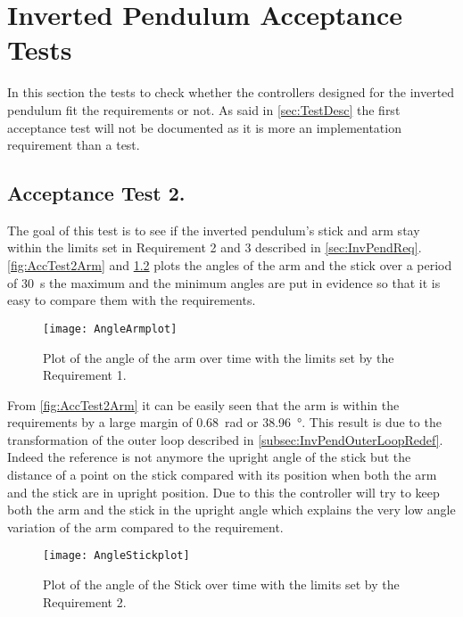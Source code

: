 \graphicspath{{figures/AcceptanceTest/}}

\chapter{Inverted Pendulum Acceptance Tests}\label{sec:InvPendAccTest}

In this section the tests to check whether the controllers designed for the inverted pendulum fit the requirements or not. As said in \autoref{sec:TestDesc} the first acceptance test will not be documented as it is more an implementation requirement than a test.

\section{Acceptance Test 2.}

The goal of this test is to see if the inverted pendulum's stick and arm stay within the limits set in Requirement 2 and 3 described in \autoref{sec:InvPendReq}. \autoref{fig:AccTest2Arm} and \ref{fig:AccTest2Stick} plots the angles of the arm and the stick over a period of \SI{30}{\second} the maximum and the minimum angles are put in evidence so that it is easy to compare them with the requirements.

\begin{figure} [htbp]
	\centering
	\texttt{[image: AngleArmplot]}
	\caption{Plot of the angle of the arm over time with the limits set by the Requirement 1.}
	\label{fig:AccTest2Arm}
\end{figure}

From \autoref{fig:AccTest2Arm} it can be easily seen that the arm is within the requirements by a large margin of \SI{0.68}{\radian} or \SI{38.96}{\degree}. This result is due to the transformation of the outer loop described in \autoref{subsec:InvPendOuterLoopRedef}. Indeed the reference is not anymore the upright angle of the stick but the distance of a point on the stick compared with its position when both the arm and the stick are in upright position. Due to this the controller will try to keep both the arm and the stick in the upright angle which explains the very low angle variation of the arm compared to the requirement.

\begin{figure} [htbp]
	\centering
	\texttt{[image: AngleStickplot]}
	\caption{Plot of the angle of the Stick over time with the limits set by the Requirement 2.}
	\label{fig:AccTest2Stick}
\end{figure}

